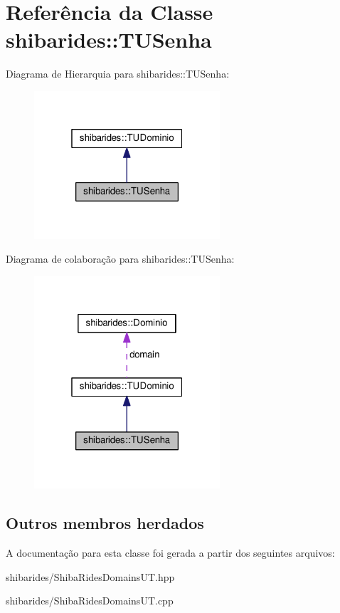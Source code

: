 \hypertarget{classshibarides_1_1TUSenha}{}\section{Referência da Classe shibarides\+:\+:T\+U\+Senha}
\label{classshibarides_1_1TUSenha}


Diagrama de Hierarquia para shibarides\+:\+:T\+U\+Senha\+:\nopagebreak
\begin{figure}[H]
\begin{center}
\leavevmode
\includegraphics[width=196pt]{classshibarides_1_1TUSenha__inherit__graph}
\end{center}
\end{figure}


Diagrama de colaboração para shibarides\+:\+:T\+U\+Senha\+:\nopagebreak
\begin{figure}[H]
\begin{center}
\leavevmode
\includegraphics[width=196pt]{classshibarides_1_1TUSenha__coll__graph}
\end{center}
\end{figure}
\subsection*{Outros membros herdados}


A documentação para esta classe foi gerada a partir dos seguintes arquivos\+:\begin{DoxyCompactItemize}
\item 
shibarides/Shiba\+Rides\+Domains\+U\+T.\+hpp\item 
shibarides/Shiba\+Rides\+Domains\+U\+T.\+cpp\end{DoxyCompactItemize}
